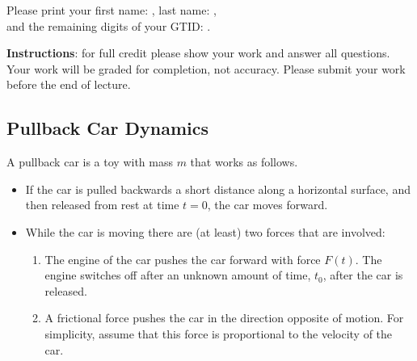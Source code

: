 \documentclass[12pt]{exam}
\begin{document}
    
\vspace*{-1cm}

\begin{center}
{\Large \TestName}
\end{center}
\newcommand{\ID}{Please print your first name: \framebox{\strut\hspace{4.2cm}}, last name: \framebox{\strut\hspace{4.2cm}}, \\[2pt] and the remaining digits of your GTID:  \framebox{\strut $9$}\framebox{\strut $0$}\framebox{\strut\hspace{0.19cm}}\framebox{\strut\hspace{0.19cm}}\framebox{\strut\hspace{0.19cm}}\framebox{\strut\hspace{0.19cm}}\framebox{\strut\hspace{0.19cm}}\framebox{\strut\hspace{0.19cm}}\framebox{\strut\hspace{0.19cm}}.}

\ID

\vspace{6pt}
\textbf{Instructions}: for full credit please show your work and answer all questions. Your work will be graded for completion, not accuracy. Please submit your work before the end of lecture. 
\subsection*{Pullback Car Dynamics}
A pullback car is a toy with mass $m$ that works as follows. 
    \begin{itemize}
        \item If the car is pulled backwards a short distance along a horizontal surface, and then released from rest at time $t=0$, the car moves forward. 
        \item While the car is moving there are (at least) two forces that are involved:
        
\begin{enumerate}[label=\alph*)]        
        \item The engine of the car pushes the car forward with force $F(t)$. The engine switches off after an unknown amount of time, $t_0$, after the car is released. 
        \item A frictional force pushes the car in the direction opposite of motion. For simplicity, assume that this force is proportional to the velocity of the car. 
    \end{enumerate} 
    \end{itemize}
\end{document}
